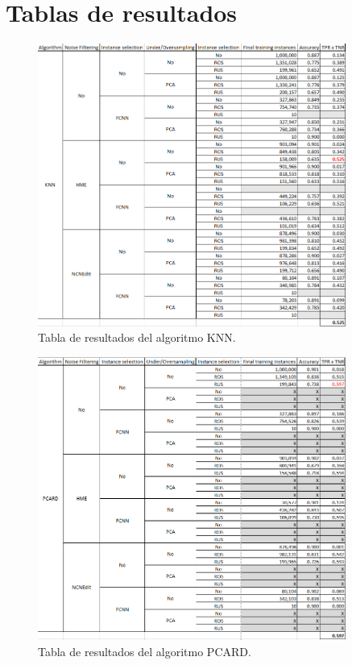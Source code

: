 \section{Tablas de resultados}

\begin{figure}[ht]
    \centerfloat
    \includegraphics[width=0.9\textwidth]{img/knn.png}
    \caption{Tabla de resultados del algoritmo KNN.}
\end{figure}

\begin{figure}[ht]
    \centerfloat
    \includegraphics[width=0.9\textwidth]{img/pcard.png}
    \caption{Tabla de resultados del algoritmo PCARD.}
\end{figure}

